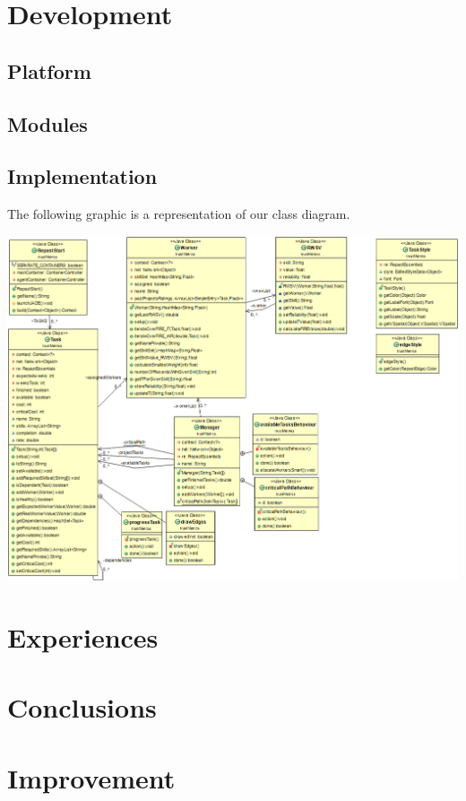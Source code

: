 \documentclass[paper=a4, fontsize=11pt]{scrartcl} %
\numberwithin{equation}{section} %
\numberwithin{figure}{section} %
\numberwithin{table}{section} %
\begin{document}
\section{Development}

\subsection{Platform}

\subsection{Modules}

\subsection{Implementation}
The following graphic is a representation of our class diagram.
\begin{center}
	\includegraphics[scale=0.4]{Model.png}
\end{center}
\section{Experiences}

\section{Conclusions}

\section{Improvement}
\end{document}
